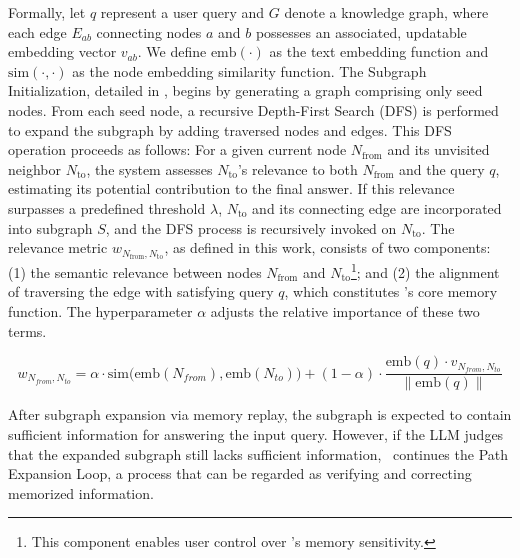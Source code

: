 Formally, let $q$ represent a user query and $G$ denote a knowledge graph, where each edge $E_{ab}$ connecting nodes $a$ and $b$ possesses an associated, updatable embedding vector $v_{ab}$. We define $\text{emb}(\cdot)$ as the text embedding function and $\text{sim}(\cdot, \cdot)$ as the node embedding similarity function. The Subgraph Initialization, detailed in , begins by generating a graph comprising only seed nodes. From each seed node, a recursive Depth-First Search (DFS) is performed to expand the subgraph by adding traversed nodes and edges. This DFS operation proceeds as follows: For a given current node $N_{\text{from}}$ and its unvisited neighbor $N_{\text{to}}$, the system assesses $N_{\text{to}}$'s relevance to both $N_{\text{from}}$ and the query $q$, estimating its potential contribution to the final answer. If this relevance surpasses a predefined threshold $\lambda$, $N_{\text{to}}$ and its connecting edge are incorporated into subgraph $S$, and the DFS process is recursively invoked on $N_{\text{to}}$. The relevance metric $w_{N_{\text{from}},N_{\text{to}}}$, as defined in this work, consists of two components: (1) the semantic relevance between nodes $N_{\text{from}}$ and $N_{\text{to}}$\footnote{This component enables user control over \ours's memory sensitivity.}; and (2) the alignment of traversing the edge with satisfying query $q$, which constitutes \ours's core memory function. The hyperparameter $\alpha$ adjusts the relative importance of these two terms.


\begin{equation}
    w_{N_{from},N_{to}} = \alpha \cdot \mathrm{sim}\big(\mathrm{emb}(N_{from}), \mathrm{emb}(N_{to})\big) + (1-\alpha) \cdot \frac{\mathrm{emb}(q) \cdot v_{N_{from},N_{to}}}{\|\mathrm{emb}(q)\|}
\label{eq:dfs-step-in}
\end{equation}


After subgraph expansion via memory replay, the subgraph is expected to contain sufficient information for answering the input query. However, if the LLM judges that the expanded subgraph still lacks sufficient information, \ours~continues the Path Expansion Loop, a process that can be regarded as verifying and correcting memorized information.
